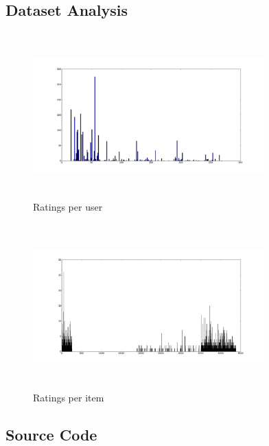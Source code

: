 \documentclass{article}
\begin{document}
\subsection{Dataset Analysis}

\begin{figure}[H]

\includegraphics[height=2.5in, width=3.5in]{ratingsperuser.png}
\caption{Ratings per user}
\label{ruser}
\end{figure}

\begin{figure}[H]

\includegraphics[height=2.5in, width=3.5in]{ratungspermovie.png}
\caption{Ratings per item}
\label{ritem}
\end{figure}




\subsection{Source Code}
\end{document}
